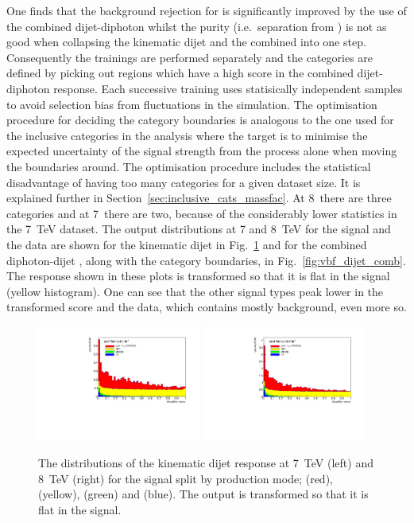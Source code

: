 One finds that the background rejection for \VBF is significantly improved by the use of the combined dijet-diphoton \BDT whilst the \VBF purity (i.e.~separation from \ggH) is not as good when collapsing the kinematic dijet \BDT and the combined \BDT into one step. Consequently the trainings are performed separately and the \VBF categories are defined by picking out regions which have a high score in the combined dijet-diphoton \BDT response. Each successive \BDT training uses statisically independent \MC samples to avoid selection bias from fluctuations in the simulation. The optimisation procedure for deciding the category boundaries is analogous to the one used for the inclusive categories in the \MFM analysis where the target is to minimise the expected uncertainty of the signal strength from the \VBF process alone when moving the boundaries around. The optimisation procedure includes the statistical disadvantage of having too many categories for a given dataset size. It is explained further in Section~\ref{sec:inclusive_cats_massfac}. At 8~\TeV there are three \VBF categories and at 7~\TeV there are two, because of the considerably lower statistics in the 7~TeV dataset. The output distributions at 7 and 8~TeV for the signal and the data are shown for the kinematic dijet \BDT in Fig.~\ref{fig:vbf_dijet_kin} and for the combined diphoton-dijet \BDT, along with the \VBF category boundaries, in Fig.~\ref{fig:vbf_dijet_comb}. The \BDT response shown in these plots is transformed so that it is flat in the \VBF signal (yellow histogram). One can see that the other signal types peak lower in the transformed score and the data, which contains mostly background, even more so. 

\begin{figure}
  \includegraphics[width=0.48\textwidth]{selec_and_cats/plots/dijetbdt_transformed_signal_7TeV_fix.pdf}
  \includegraphics[width=0.48\textwidth]{selec_and_cats/plots/dijetbdt_transformed_signal_8TeV_fix.pdf} 
  \caption[The kinematic dijet \acs{BDT} response]{The distributions of the kinematic dijet \BDT response at 7~TeV (left) and 8~TeV (right) for the signal split by production mode; \ggH (red), \VBF (yellow), \VH (green) and \ttH (blue). The output is transformed so that it is flat in the \VBF signal.}
  \label{fig:vbf_dijet_kin}
\end{figure}

